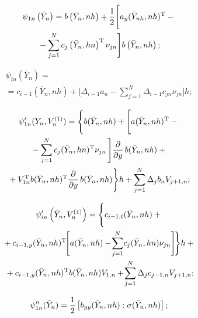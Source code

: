 \begin{multicols}{2}
\noindent
\begin{multline*}
        \psi_{1n}\left(\bar Y_n\right)=b\left(\bar Y_n,nh\right)+\displaystyle\frac{\displaystyle 1\mathstrut}{\displaystyle 2\mathstrut}\Biggl[ a_y(\bar 
Y_{nh},nh)^{\mathrm{T}}-  {}\\
{}-  \sum\limits_{j=1}^N c_j \left(\bar Y_n,hn\right)^{\mathrm{T}} \nu_{jn}\Biggr] b\left(\bar     Y_n,nh\right);
    \end{multline*}
    
    \vspace*{-12pt}

\noindent
\begin{multline*}
\psi_{{in}}(\bar Y_n)={}\\
{}=c_{i-1}(\bar Y_n,nh)+\Biggl[ \Delta_{i-1}a_n-\sum\limits_{j=1}^N
    \Delta_{i-1}c_{jn}\nu_{jn} \Biggr]h; %
    \end{multline*}
    
    \vspace*{-12pt}

\noindent
\begin{multline*}
\psi_{1n}'(Y_n,V_n^{(1)})=\Bigg\{b(\bar Y_n,nh)+
    \Biggl[ a(\bar Y_n,nh)^{\mathrm{T}}-{}\\
{}-\sum\limits_{j=1}^N c_j(\bar Y_n,hn)^{\mathrm{T}} \nu_{jn}\,\Biggr]\fr{\partial}{\partial 
y}\, b(\bar Y_n,nh)+{}\\
{}+V_{1n}^{\mathrm{T}} b(\bar Y_n,nh)^{\mathrm{T}} \fr{\partial}{\partial y}\,b(\bar Y_n,nh)
    \Bigg\}h+\sum\limits_{j=1}^N \Delta_j b_{n}V_{j+1,n}; %
    \end{multline*}
    
    \vspace*{-12pt}

\noindent
\begin{multline*}
\psi_{in}'\left(\bar Y_n,V_n^{(1)}\right)=\Biggl\{ c_{i-1,t}(\bar
    Y_n,nh)+{}\\
    {}+ c_{i-1,y}(\bar Y_n,nh)^{\mathrm{T}}\!
    \Biggl[a(\bar Y_n,nh)-\!\sum_{j=1}^N \!c_j(\bar 
Y_n,hn)\nu_{jn}  \Biggr]\!\Biggr\}h+{}\\
{}+c_{i-1,y}(\bar Y_n,nh)^{\mathrm{T}} b(\bar Y_n,nh)V_{1,n}+\!
\sum\limits_{j=1}^N
    \Delta_j c_{j-1,n}V_{j+1,n};\hspace*{-1pt} %
    \end{multline*}
    
    \noindent
    \begin{equation*}
\psi_{1n}''(\bar Y_n)=\fr{1}{2}\left[b_{yy}(\bar Y_n,nh):
    \sigma(\bar Y_n,nh)\right]; %
    \end{equation*}
    

\end{multicols}
